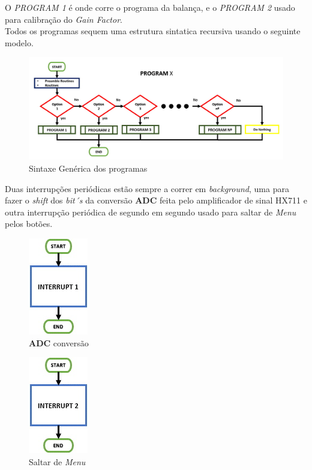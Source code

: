 O \textit{PROGRAM 1} é onde corre o programa da balança, e o \textit{PROGRAM 2} usado para calibração do \textit{Gain Factor}. \\
\newpage
Todos os programas sequem uma estrutura sintatica recursiva usando o seguinte modelo.
\begin{figure}[H]
	\centering
	\includegraphics[scale=0.43]{./image/PESTA/flowchart/Generic_structure.jpg}
	\caption{Sintaxe Genérica dos programas}
	\label{Geneic_structure}
\end{figure}
Duas interrupções periódicas estão sempre a correr em \textit{background}, uma para fazer o \textit{shift} dos \textit{bit´s} da conversão \textbf{ADC} feita pelo amplificador de sinal HX711 e outra interrupção periódica de segundo em segundo usado para saltar de \textit{Menu} pelos botões.
\begin{minipage}{\linewidth}
\begin{minipage}{.45\linewidth}
\begin{figure}[H]
	\centering
	\includegraphics[scale=0.43]{./image/PESTA/flowchart/Interrupt_1.jpg}
	\caption{\textbf{ADC} conversão}
	\label{Interrupt_1}
\end{figure}
\end{minipage}
\begin{minipage}{.5\linewidth}
\begin{figure}[H]
	\centering
	\includegraphics[scale=0.43]{./image/PESTA/flowchart/Interrupt_2.jpg}
	\caption{Saltar de \textit{Menu}}
	\label{Interrupt_2}
\end{figure}
\end{minipage}
\end{minipage}
\newpage
